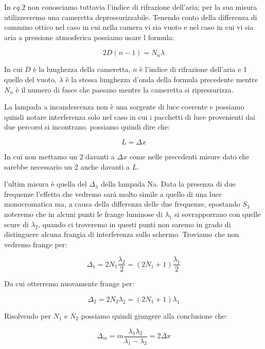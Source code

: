 \documentclass{article}
\begin{document}
In $eq.2$ non conosciamo tuttavia l'indice di rifrazione dell'aria; per la sua misura utilizzeeremo una cameretta depressurizzabile. Tenendo conto della differenza di cammino ottico nel caso in cui nella camera vi sia vuoto e nel caso in cui vi sia aria a pressione atmosferica possiamo usare l formula:

\begin{equation}
 2D (n {-} 1) = N_n \lambda
\end{equation}

In cui $D$ è la lunghezza della cameretta, $n$ è l'indice di rifrazione dell'aria e 1 quello del vuoto, $\lambda$ è la stessa lunghezza d'onda della formula precedente mentre $N_n$ è il numero di fasce  che passano mentre la cameretta si ripressurizza.

La lampada a incandescenza non è una sorgente di luce coerente e possiamo quindi notare interferenza solo nel caso in cui i pacchetti di luce provenienti dai due percorsi si incontrano. possiamo quindi dire che:

\begin{equation} 
L = \Delta{x} 
\end{equation}

In cui non mettamo un 2 davanti a $\Delta{x}$ come nelle precedenti misure dato che sarebbe necessario un 2 anche davanti a $L$.

l'ultim misura è quella del $\Delta_\lambda$ della lampada Na. Data la presenza di due frequenze l'effetto che vedremo sarà molto simile a quello di una luce monocromatica ma, a causa della differenza delle due frequenze, spostando $S_3$ noteremo che in alcuni punti le frange luminose di $\lambda_1$ si sovrapporrano con quelle scure di $\lambda_2$, quando ci troveremo in questi punti non saremo in grado di distinguere alcuna frangia di interferenza sullo schermo. Troviamo che non vedremo frange per:

\begin{equation} 
\Delta_1 = 2 N_1 \frac{\lambda_2}{2} = (2 N_1 + 1) \frac{\lambda_1}{2} 
\end{equation}

Da cui otterremo nuovamente frange per:

\begin{equation} 
\Delta_2 = 2N_2 \lambda_2 =(2 N_1 + 1) \lambda_1 
\end{equation}

Risolvendo per $N_1$ e $N_2$ possiamo quindi giungere alla conclusione che:

\begin{equation} 
\Delta_m = m \frac{\lambda_1 \lambda_2}{\lambda_1 {-} \lambda_2} = 2 \Delta{x} 
\end{equation}
\end{document}
